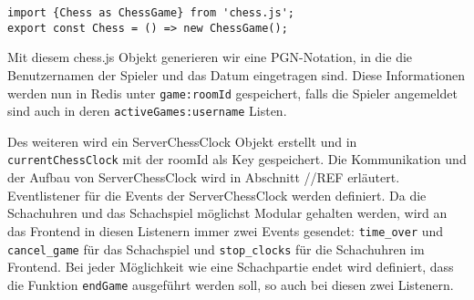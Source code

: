 \begin{lstlisting}[style=codeStyle, caption={Die Chess.mjs Datei}, label={lst:Chess.mjs}]
import {Chess as ChessGame} from 'chess.js';
export const Chess = () => new ChessGame();
\end{lstlisting}

Mit diesem chess.js Objekt generieren wir eine PGN-Notation, in die die Benutzernamen der Spieler und das Datum eingetragen sind. Diese Informationen werden nun in Redis unter \verb|game:roomId| gespeichert, falls die Spieler angemeldet sind auch in deren \verb|activeGames:username| Listen. 

Des weiteren wird ein ServerChessClock Objekt erstellt und in \verb|currentChessClock| mit der roomId als Key gespeichert. Die Kommunikation und der Aufbau von ServerChessClock wird in Abschnitt //REF erläutert.
Eventlistener für die Events der ServerChessClock werden definiert.
Da die Schachuhren und das Schachspiel möglichst Modular gehalten werden, wird an das Frontend in diesen Listenern immer zwei Events gesendet: \verb|time_over| und \verb|cancel_game| für das Schachspiel und \verb|stop_clocks| für die Schachuhren im Frontend. Bei jeder Möglichkeit wie eine Schachpartie endet wird definiert, dass die Funktion \verb|endGame| ausgeführt werden soll, so auch bei diesen zwei Listenern.


